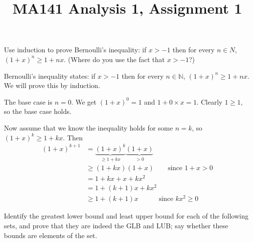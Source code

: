 \documentclass[a4paper]{article}
\title{MA141 Analysis 1, Assignment 1}
\begin{document}
\maketitle

\setlength{\parindent}{0em}
\setlength{\parskip}{1em}


\begin{questionbody}
Use induction to prove Bernoulli’s inequality: if $x > -1$ then for every $n \in N$, ${(1 + x)}^n \ge 1 + nx$. (Where do you use the fact that $x > -1$?)
\end{questionbody}

Bernoulli's inequality states: if $x > -1$ then for every $n \in \mathbb{N}$, ${(1 + x)}^n \ge 1 + nx$. We will prove this by induction.

The base case is $n = 0$. We get ${(1 + x)}^0 = 1$ and $1 + 0 \times x = 1$. Clearly $1 \ge 1$, so the base case holds.

Now assume that we know the inequality holds for some $n = k$, so ${(1 + x)}^k \ge 1 + kx$. Then
\begin{align*}
    {(1 + x)}^{k+1} &= \underbrace{{(1 + x)}^k}_{\ge 1 + kx} \underbrace{(1 + x)}_{> 0} \\[1ex]
                    &\ge (1 + kx) (1 + x) \qquad\text{since } 1 + x > 0 \\[1ex]
                    &= 1 + kx + x + kx^2 \\[1ex]
                    &= 1 + (k+1)x + kx^2 \\[1ex]
                    &\ge 1 + (k+1)x \qquad\quad\text{since }kx^2 \ge 0
\end{align*}

%
%


\begin{questionbody}
Identify the greatest lower bound and least upper bound for each of the following sets, and prove that they are indeed the GLB and LUB; say whether these bounds are elements of the set. %
\end{questionbody}
\end{document}
